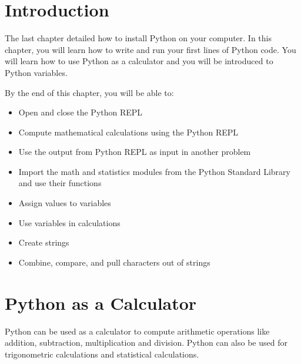 \documentclass{book}
\begin{document}
    
        \hypertarget{introduction}{%
\section{Introduction}\label{introduction}}
    




    
        The last chapter detailed how to install Python on your computer. In
this chapter, you will learn how to write and run your first lines of
Python code. You will learn how to use Python as a calculator and you
will be introduced to Python variables.
    




    
        By the end of this chapter, you will be able to:

\begin{itemize}
\item
  Open and close the Python REPL
\item
  Compute mathematical calculations using the Python REPL
\item
  Use the output from Python REPL as input in another problem
\item
  Import the math and statistics modules from the Python Standard
  Library and use their functions
\item
  Assign values to variables
\item
  Use variables in calculations
\item
  Create strings
\item
  Combine, compare, and pull characters out of strings
\end{itemize}
        \newpage

    




    
        \hypertarget{python-as-a-calculator}{%
\section{Python as a Calculator}\label{python-as-a-calculator}}
    




    
        Python can be used as a calculator to compute arithmetic operations like
addition, subtraction, multiplication and division. Python can also be
used for trigonometric calculations and statistical calculations.
    
\end{document}
